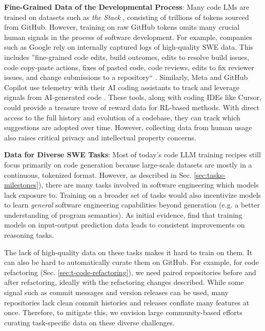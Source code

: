 \textbf{Fine-Grained Data of the Developmental Process}: Many code LMs are trained on datasets such as \textit{the Stack} \citep{kocetkov2022stack, lozhkov2024starcoder}, consisting of trillions of tokens sourced from GitHub. However, training on raw GitHub tokens omits many crucial human signals in the process of software development. For example, companies such as Google rely on internally captured logs of high-quality SWE data. This includes ''fine-grained code edits, build outcomes, edits to resolve build issues, code copy-paste actions, fixes of pasted code, code reviews, edits to fix reviewer issues, and change submissions to a repository`` \citep{chandra2024ai}. Similarly, Meta and GitHub Copilot use telemetry with their AI coding assistants to track and leverage signals from AI-generated code \citep{murali2024ai, ziegler2024measuring}. These tools, along with coding IDEs like Cursor, could provide a treasure trove of reward data for RL-based methods. With direct access to the full history and evolution of a codebase, they can track which suggestions are adopted over time. However, collecting data from human usage also raises critical privacy and intellectual property concerns.

\textbf{Data for Diverse SWE Tasks}: Most of today's code LLM training recipes still focus primarily on code generation because large-scale datasets are mostly in a continuous, tokenized format. However, as described in Sec. \ref{sec:tasks-milestones}), there are many tasks involved in software engineering which models lack exposure to. Training on a broader set of tasks would also incentivize models to learn \textit{general} software engineering capabilities beyond generation (e.g. a better understanding of program semantics). As initial evidence, \cite{li2025codei} find that training models on input-output prediction data leads to consistent improvements on reasoning tasks. 

The lack of high-quality data on these tasks makes it hard to train on them. It can also be hard to automatically curate them on GitHub. For example, for code refactoring (Sec. \ref{sec:t-code-refactoring}), we need paired repositories before and after refactoring, ideally with the refactoring changes described. While some signal such as commit messages and version releases can be used, many repositories lack clean commit histories and releases conflate many features at once. Therefore, to mitigate this, we envision large community-based efforts curating task-specific data on these diverse challenges. 

